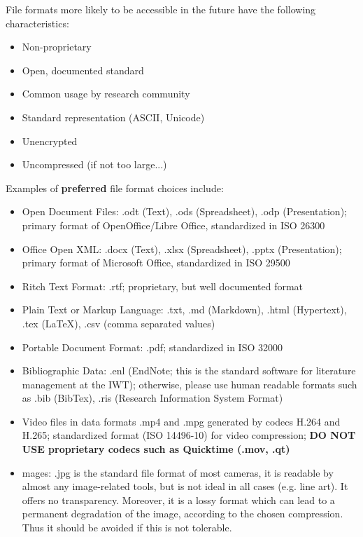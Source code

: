 File formats more likely to be accessible in the future have the following
characteristics:
\begin{itemize}
  \item Non-proprietary
  \item Open, documented standard
  \item Common usage by research community
  \item Standard representation (ASCII, Unicode)
  \item Unencrypted
  \item Uncompressed (if not too large...)
\end{itemize}

\noindent Examples of \textbf{preferred} file format choices include:
\begin{itemize}
  \item Open Document Files: .odt (Text), .ods (Spreadsheet),
        .odp (Presentation); primary format of OpenOffice/Libre Office,
        standardized in ISO 26300
  \item Office Open XML: .docx (Text), .xlsx (Spreadsheet),
        .pptx (Presentation); primary format of Microsoft Office,
        standardized in ISO 29500
  \item Ritch Text Format: .rtf; proprietary, but well documented format
  \item Plain Text or Markup Language: .txt, .md (Markdown), .html (Hypertext),
       .tex (LaTeX), .csv (comma separated values)
  \item Portable Document Format: .pdf; standardized in ISO 32000
  \item Bibliographic Data: .enl (EndNote; this is the standard software for
        literature management at the IWT); otherwise, please use human readable
        formats such as .bib (BibTex), .ris (Research Information System Format)
  \item Video files in data formats .mp4 and .mpg generated by codecs H.264 and
        H.265; standardized format (ISO 14496-10) for video compression;
        \textbf{DO NOT USE proprietary codecs such as Quicktime (.mov, .qt)}
  \item mages: .jpg is the standard file format of most cameras, it is readable
        by almost any image-related tools, but is not ideal in all cases (e.g.
        line art). It offers no transparency. Moreover, it is a lossy format
        which can lead to a permanent degradation of the image, according to the
        chosen compression. Thus it should be avoided if this is not tolerable.

\end{itemize}
